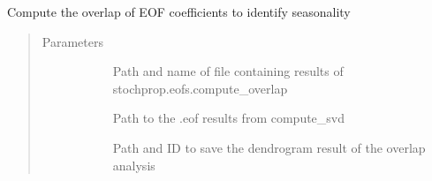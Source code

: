 \documentclass[letterpaper,10pt,english]{sphinxmanual}
\begin{document}
\begin{fulllineitems}
\label{\detokenize{stochprop.eofs:stochprop.eofs.compute_seasonality}}
Compute the overlap of EOF coefficients to identify seasonality
\begin{quote}\begin{description}
\item[{Parameters}] \leavevmode\begin{description}
\item[{}] \leavevmode
Path and name of file containing results of stochprop.eofs.compute\_overlap

\item[{}] \leavevmode
Path to the .eof results from compute\_svd

\item[{}] \leavevmode
Path and ID to save the dendrogram result of the overlap analysis

\end{description}

\end{description}\end{quote}

\end{fulllineitems}

\end{document}
